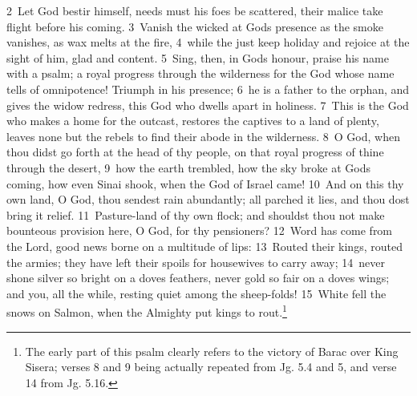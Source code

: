 \documentclass[10pt]{book} %
\begin{document}
\textcolor{benred8}{2}~Let God bestir himself, needs must his foes be scattered, their malice take flight before his coming. \textcolor{benred8}{3}~Vanish the wicked at God\textquotesingle s presence as the smoke vanishes, as wax melts at the fire, \textcolor{benred8}{4}~while the just keep holiday and rejoice at the sight of him, glad and content. \textcolor{benred8}{5}~Sing, then, in God\textquotesingle s honour, praise his name with a psalm; a royal progress through the wilderness for the God whose name tells of omnipotence! Triumph in his presence; \textcolor{benred8}{6}~he is a father to the orphan, and gives the widow redress, this God who dwells apart in holiness. \textcolor{benred8}{7}~This is the God who makes a home for the outcast, restores the captives to a land of plenty, leaves none but the rebels to find their abode in the wilderness.
\textcolor{benred8}{8}~O God, when thou didst go forth at the head of thy people, on that royal progress of thine through the desert, \textcolor{benred8}{9}~how the earth trembled, how the sky broke at God\textquotesingle s coming, how even Sinai shook, when the God of Israel came! \textcolor{benred8}{10}~And on this thy own land, O God, thou sendest rain abundantly; all parched it lies, and thou dost bring it relief. \textcolor{benred8}{11}~Pasture-land of thy own flock; and shouldst thou not make bounteous provision here, O God, for thy pensioners?
\textcolor{benred8}{12}~Word has come from the Lord, good news borne on a multitude of lips: \textcolor{benred8}{13}~Routed their kings, routed the armies; they have left their spoils for housewives to carry away; \textcolor{benred8}{14}~never shone silver so bright on a dove\textquotesingle s feathers, never gold so fair on a dove\textquotesingle s wings; and you, all the while, resting quiet among the sheep-folds! \textcolor{benred8}{15}~White fell the snows on Salmon, when the Almighty put kings to rout.\footnote[1]{The early part of this psalm clearly refers to the victory of Barac over King Sisera; verses 8 and 9 being actually repeated from Jg. 5.4 and 5, and verse 14 from Jg. 5.16.}
\end{document}
